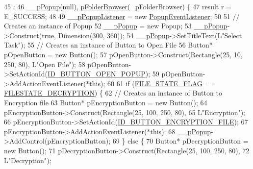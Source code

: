 \begin{DoxyCode}
45                                                                    :
46         \hyperlink{class_list_view_item_popup_ae2763988a34f0ecbfb81aeb3cc2ca59a}{\_\_pPopup}(null), \hyperlink{class_list_view_item_popup_a33b5bebeb60329746d785d2b721748b0}{pFolderBrowser}(\_pFolderBrowser) \{
47     result r = E\_SUCCESS;
48 
49     \hyperlink{class_list_view_item_popup_a42979e0b89cd38da4f6046e678d21437}{\_\_pPopupListener} = \textcolor{keyword}{new} \hyperlink{class_popup_event_listener}{PopupEventListener};
50 
51     \textcolor{comment}{// Creates an instance of Popup}
52     \hyperlink{class_list_view_item_popup_ae2763988a34f0ecbfb81aeb3cc2ca59a}{\_\_pPopup} = \textcolor{keyword}{new} Popup;
53     \hyperlink{class_list_view_item_popup_ae2763988a34f0ecbfb81aeb3cc2ca59a}{\_\_pPopup}->Construct(\textcolor{keyword}{true}, Dimension(300, 360));
54     \hyperlink{class_list_view_item_popup_ae2763988a34f0ecbfb81aeb3cc2ca59a}{\_\_pPopup}->SetTitleText(L\textcolor{stringliteral}{"Select Task"});
55     \textcolor{comment}{// Creates an instance of Button to Open File}
56     Button* pOpenButton = \textcolor{keyword}{new} Button();
57     pOpenButton->Construct(Rectangle(25, 10, 250, 80), L\textcolor{stringliteral}{"Open File"});
58     pOpenButton->SetActionId(\hyperlink{class_list_view_item_popup_a039ba26046cd62bd44d24d60fa0cc2f6}{ID\_BUTTON\_OPEN\_POPUP});
59     pOpenButton->AddActionEventListener(*\textcolor{keyword}{this});
60 
61     \textcolor{keywordflow}{if} (\hyperlink{_list_view_item_popup_8cpp_a514e8b025bf71e7b0500f6f8efb635ce}{FILE\_STATE\_FLAG} == \hyperlink{class_list_view_item_popup_a8f4af33ad25eb4228734b49c521d052c}{FILESTATE\_DECRYPTION}) \{
62         \textcolor{comment}{// Creates an instance of Button to Encryption file}
63         Button* pEncryptionButton = \textcolor{keyword}{new} Button();
64         pEncryptionButton->Construct(Rectangle(25, 100, 250, 80),
65                 L\textcolor{stringliteral}{"Encryption"});
66         pEncryptionButton->SetActionId(\hyperlink{class_list_view_item_popup_a61acb07d5c6a128502350c9a309eb171}{ID\_BUTTON\_ENCRYPTION\_FILE});
67         pEncryptionButton->AddActionEventListener(*\textcolor{keyword}{this});
68         \hyperlink{class_list_view_item_popup_ae2763988a34f0ecbfb81aeb3cc2ca59a}{\_\_pPopup}->AddControl(pEncryptionButton);
69     \} \textcolor{keywordflow}{else} \{
70         Button* pDecryptionButton = \textcolor{keyword}{new} Button();
71         pDecryptionButton->Construct(Rectangle(25, 100, 250, 80),
72                 L\textcolor{stringliteral}{"Decryption"});

\end{DoxyCode}

